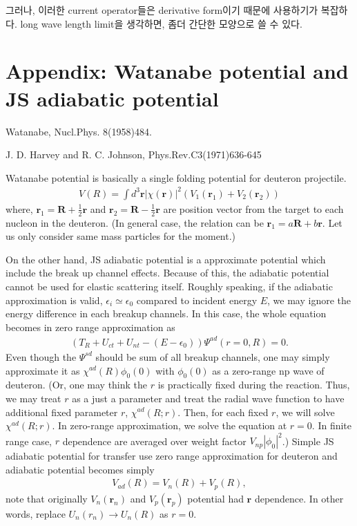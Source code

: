 \documentclass[11pt]{book}
\def\bm{\boldsymbol}
\def\vr{{\bm r}}
\def\vR{{\bm R}}
\newcommand{\bea}{\begin{eqnarray}}
\newcommand{\eea}{\end{eqnarray}}
\begin{document}
그러나, 이러한 current operator들은 derivative form이기 때문에 사용하기가 복잡하다.
long wave length limit을 생각하면, 좀더 간단한 모양으로 쓸 수 있다. 






\section{Appendix: Watanabe potential and JS adiabatic potential}
Watanabe, Nucl.Phys. 8(1958)484. 

J. D. Harvey and R. C. Johnson, Phys.Rev.C3(1971)636-645

Watanabe potential is basically a single folding potential for deuteron projectile.
\bea 
V(R)=\int d^3\vr |\chi(\vr)|^2\left( V_1(\vr_1)+V_2(\vr_2)\right) 
\eea 
where, $\vr_1=\vR+\frac{1}{2}\vr$ and $\vr_2=\vR-\frac{1}{2}\vr$ are
position vector from the target to each nucleon in the deuteron. 
(In general case, the relation can be $\vr_1=a\vR+b\vr$. Let us  only consider 
same mass particles for the moment.)

On the other hand, JS adiabatic potential is a approximate potential
which include the break up channel effects. Because of this, the adiabatic 
potential cannot be used for elastic scattering itself. 
Roughly speaking, if the adiabatic approximation is valid, $\epsilon_i\simeq \epsilon_0$
compared to incident energy $E$, we may ignore the energy difference in each breakup channels.
In this case, the whole equation becomes in zero range approximation as 
\bea 
(T_R+U_{ct}+U_{nt}-(E-\epsilon_0))\Psi^{ad}(r=0,R) = 0. 
\eea 
Even though the $\Psi^{sd}$ should be sum of all breakup channels,
one may simply approximate it as $\chi^{ad}(R)\phi_0(0)$ with 
$\phi_0(0)$ as a zero-range np wave of deuteron. 
(Or, one may think the $r$ is practically fixed during the reaction. 
Thus, we may treat $r$ as a just a parameter and treat the radial
wave function to have additional fixed parameter $r$, $\chi^{ad}(R;r)$.
Then, for each fixed $r$, we will solve $\chi^{ad}(R;r) $.
In zero-range approximation, we solve the equation at $r=0$. 
In finite range case, $r$ dependence are averaged over weight factor
$V_{np}|\phi_0|^2$.)
Simple JS adiabatic potential for transfer use zero range approximation for 
deuteron and adiabatic potential becomes simply
\bea 
V_{ad}(R)=V_n(R)+V_p(R),
\eea  
note that originally $V_n(\vr_n)$ and $V_p(\vr_p)$ potential had $\vr$ dependence. 
In other words, replace $U_n(r_n)\to U_n(R)$ as $r=0$. 
\end{document}
